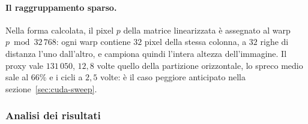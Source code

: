 \paragraph{Il raggruppamento sparso.}
Nella forma calcolata, il pixel $p$ della matrice linearizzata è assegnato al
warp $p \bmod 32\,768$: ogni warp contiene $32$ pixel della stessa colonna, a
$32$ righe di distanza l'uno dall'altro, e campiona quindi l'intera altezza
dell'immagine. Il proxy vale $131\,050$, $12{,}8$ volte quello della partizione
orizzontale, lo spreco medio sale al $66\%$ e i cicli a $2{,}5$ volte: è il caso
peggiore anticipato nella sezione~\ref{sec:cuda-sweep}.

\subsubsection{Analisi dei risultati}
\label{sec:cuda-risultati}

%
%

